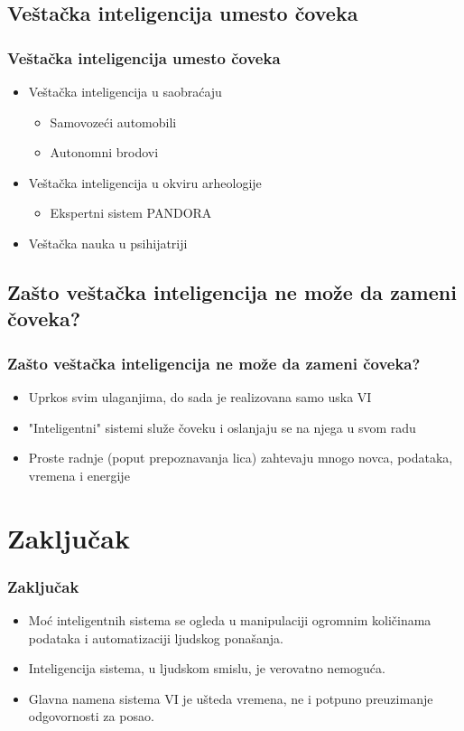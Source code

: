\documentclass{beamer}
\begin{document}
\subsection{Veštačka inteligencija umesto čoveka}
\begin{frame}[fragile]\frametitle{Veštačka inteligencija umesto čoveka}
\begin{itemize}
    \item Veštačka inteligencija u saobraćaju
    \begin{itemize}
        \item Samovozeći automobili
        \item Autonomni brodovi
    \end{itemize}
    \item Veštačka inteligencija u okviru arheologije
    \begin{itemize}
        \item Ekspertni sistem PANDORA
    \end{itemize}
    \item Veštačka nauka u psihijatriji
    
\end{itemize}

\end{frame}

\subsection{Zašto veštačka inteligencija ne može da zameni čoveka?}
\begin{frame}[fragile]\frametitle{Zašto veštačka inteligencija ne može da zameni čoveka?}

\begin{itemize}
    \item Uprkos svim ulaganjima, do sada je realizovana samo uska VI
    \item "Inteligentni" sistemi služe čoveku i oslanjaju se na njega u svom radu
    \item Proste radnje (poput prepoznavanja lica) zahtevaju mnogo novca, podataka, vremena i energije
\end{itemize}

\end{frame}

\section{Zaključak}

\begin{frame}[fragile]\frametitle{Zaključak}
        \begin{itemize}
            \item Moć inteligentnih sistema se ogleda u manipulaciji ogromnim količinama podataka i automatizaciji ljudskog ponašanja.
        \item Inteligencija sistema, u ljudskom smislu, je verovatno nemoguća.
        \item Glavna namena sistema VI je ušteda vremena, ne i potpuno preuzimanje odgovornosti za posao.
        \end{itemize}
\end{frame}
\end{document}
